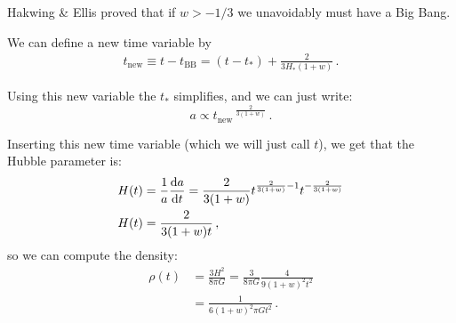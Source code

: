 \documentclass[main.tex]{subfiles}
\begin{document}
Hakwing \& Ellis proved that if \(w>-1/3\) we unavoidably must have a Big Bang.

We can define a new time variable by 
%
\begin{align}
t_{\text{new}} \equiv t-t _{\text{BB}} =  (t - t_{*}) 
+ \frac{2}{3 H_{*} (1+w)}
\,.
\end{align}

Using this new variable the \(t_{*}\) simplifies, and we can just write:
\begin{equation}
a \propto t_{\text{new}}\,^{\frac{2}{3(1+w)}}
\,.
\end{equation}

Inserting this new time variable (which we will just call \(t\)), we get that the Hubble parameter is:
\begin{align} 
H(t) &= \frac{1}{a} \dv{a}{t} = \frac{2}{3(1+w)} t^{\frac{2}{3(1+w)}-1} t^{- \frac{2}{3(1+w)}} \\
H(t) &=  \frac{2}{3(1+w) t} \label{eq:einstein-de-sitter-age}
\,,
\end{align}
so we can compute the density:
\begin{align}
\rho(t) &= \frac{3H^2}{8 \pi G} = \frac{3}{8 \pi G} \frac{4}{9 (1+w)^2 t^2} \\
&= \frac{1}{6 (1+w)^2 \pi G t^2}
\,.
\end{align}
\end{document}
